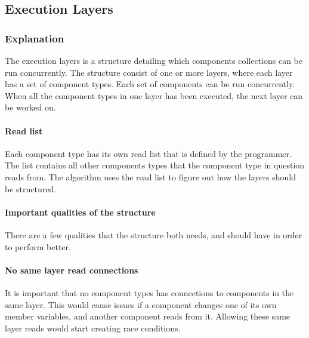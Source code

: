 \subsection{Execution Layers}

\subsubsection{Explanation}
The execution layers is a structure detailing which components collections can be run concurrently.
The structure consist of one or more layers, where each layer has a set of component types.
Each set of components can be run concurrently.
When all the component types in one layer has been executed, the next layer can be worked on.

\paragraph{Read list}
\label{subsec:detailed_read_list}
Each component type has its own read list that is defined by the programmer.
The list contains all other components types that the component type in question reads from.
The algorithm uses the read list to figure out how the layers should be structured.

\paragraph{Important qualities of the structure}
There are a few qualities that the structure both needs, and should have in order to perform better.

\paragraph{No same layer read connections}
It is important that no component types has connections to components in the same layer.
This would cause issues if a component changes one of its own member variables, and another component reads from it.
Allowing these same layer reads would start creating race conditions.

